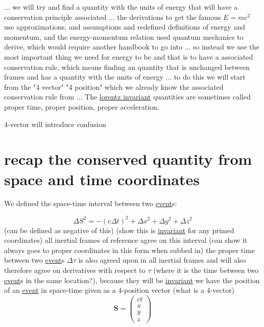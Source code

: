... we will try and find a quantity with the units of energy that will have a conservation principle associated
... the derivations to get the famous $E=mc^2$ use approximations, and assumptions and redefined definitions of energy and momentum, and the energy-momentum relation used quantum mechanics to derive, which would require another handbook to go into
... so instead we use the most important thing we need for energy to be and that is to have a associated conservation rule, which means finding an quantity that is unchanged between frames and has a quantity with the units of energy
... to do this we will start from the "4 vector" "4 position" which we already know the associated conservation rule from
... The \hyperlink{def-lorentz-invariant}{lorentz invariant} quantities are sometimes called proper time, proper position, proper acceleration.

4-vector will introduce confusion 

\section{recap the conserved quantity from space and time coordinates}

We defined the space-time interval between two \hyperlink{def-event}{event}s:

\begin{equation}
    \Delta S^2 = -(c\Delta t)^2 +\Delta x^2 +\Delta y^2 +\Delta z^2
\end{equation}
(can be defined as negative of this) (show this is \hyperlink{def-lorentz-invariant}{invariant} for any primed coordinates)
all inertial frames of reference agree on this interval (can show it always goes to proper coordinates in this form when subbed in)
the proper time between two \hyperlink{def-event}{event}s $\Delta\tau$ is also agreed upon in all inertial frames
and will also therefore agree on derivatives with respect to $\tau$ (where it is the time between two \hyperlink{def-event}{event}s in the same location?), because they will be \hyperlink{def-lorentz-invariant}{invariant}
we have the position of an \hyperlink{def-event}{event} in space-time given as a 4-position vector (what is a 4-vector)
\begin{equation}
     \mathbf{S} = \begin{pmatrix}
         ct\\x\\y\\z
     \end{pmatrix}
\end{equation}

